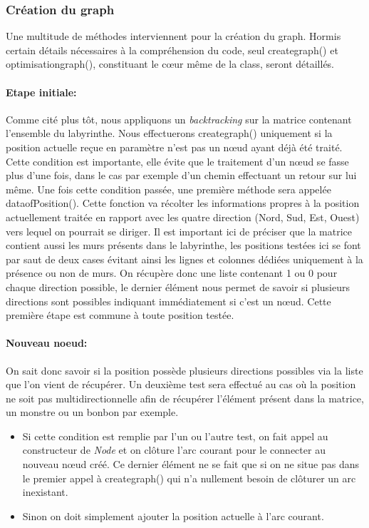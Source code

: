 \documentclass[12pt, oneside]{article}
\begin{document}
\subsubsection{Création du graph}
Une multitude de méthodes interviennent pour la création du graph. Hormis certain détails nécessaires à la compréhension  du code, seul create\textunderscore graph() et optimisation\textunderscore graph(), constituant le cœur même de la class, seront détaillés.
\paragraph{Etape initiale:}
Comme cité plus tôt, nous appliquons un \emph{backtracking} sur la matrice contenant l’ensemble du labyrinthe. Nous effectuerons create\textunderscore graph() uniquement si la position actuelle reçue en paramètre n’est pas un nœud ayant déjà été traité. Cette condition est importante, elle évite que le traitement d’un nœud se fasse plus d’une fois, dans le cas par exemple d’un chemin effectuant un retour sur lui même.
Une fois cette condition passée, une première méthode sera appelée data\textunderscore ofPosition(). Cette fonction va récolter les informations propres à la position actuellement traitée en rapport avec les quatre direction (Nord, Sud, Est, Ouest) vers lequel on pourrait se diriger. Il est important ici de préciser que la matrice contient aussi les murs présents dans le labyrinthe,  les positions testées ici se font par saut de deux cases évitant ainsi les lignes et colonnes dédiées uniquement à la présence ou non de murs.
On récupère donc une liste contenant 1 ou 0 pour chaque direction possible, le dernier élément nous permet de savoir si plusieurs directions sont possibles indiquant immédiatement si c’est un nœud. 
Cette première étape est commune à toute position testée.

\paragraph{Nouveau noeud:}
On sait donc savoir si la position possède plusieurs directions possibles via la liste que l'on vient de récupérer. Un deuxième test sera effectué au cas où la position ne soit pas multidirectionnelle afin de récupérer l’élément présent dans la matrice, un monstre ou un bonbon par exemple.

\begin{itemize}
\item 
Si cette condition est remplie par l’un ou l’autre test, on fait appel au constructeur de \emph{Node} et on clôture l’arc courant pour le connecter au nouveau nœud créé. Ce dernier élément ne se fait que si on ne situe pas dans le premier appel à create\textunderscore graph() qui n’a nullement besoin de clôturer un arc inexistant.
\item
Sinon on doit simplement ajouter la position actuelle à l’arc courant.
\end{itemize}
\end{document}
